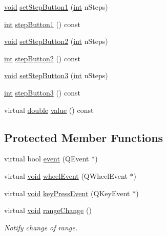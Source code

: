 \begin{DoxyCompactItemize}
\item 
\hyperlink{group___u_a_v_objects_plugin_ga444cf2ff3f0ecbe028adce838d373f5c}{void} \hyperlink{class_qwt_counter_ae56a556a72955b6d10419f2c41779383}{set\-Step\-Button1} (\hyperlink{ioapi_8h_a787fa3cf048117ba7123753c1e74fcd6}{int} n\-Steps)
\item 
\hyperlink{ioapi_8h_a787fa3cf048117ba7123753c1e74fcd6}{int} \hyperlink{class_qwt_counter_a8e0b28f111c45b3a2241fd8889bc8bce}{step\-Button1} () const 
\item 
\hyperlink{group___u_a_v_objects_plugin_ga444cf2ff3f0ecbe028adce838d373f5c}{void} \hyperlink{class_qwt_counter_a0d764a96706593d8c8b51338e92abfcc}{set\-Step\-Button2} (\hyperlink{ioapi_8h_a787fa3cf048117ba7123753c1e74fcd6}{int} n\-Steps)
\item 
\hyperlink{ioapi_8h_a787fa3cf048117ba7123753c1e74fcd6}{int} \hyperlink{class_qwt_counter_a7d99de95e1c05e4994413e6d8cd641fe}{step\-Button2} () const 
\item 
\hyperlink{group___u_a_v_objects_plugin_ga444cf2ff3f0ecbe028adce838d373f5c}{void} \hyperlink{class_qwt_counter_a8b55539578de083793b8310cb8909294}{set\-Step\-Button3} (\hyperlink{ioapi_8h_a787fa3cf048117ba7123753c1e74fcd6}{int} n\-Steps)
\item 
\hyperlink{ioapi_8h_a787fa3cf048117ba7123753c1e74fcd6}{int} \hyperlink{class_qwt_counter_abc6eb2073cc7d7b5f1d7e4c6c7b205c9}{step\-Button3} () const 
\item 
virtual \hyperlink{_super_l_u_support_8h_a8956b2b9f49bf918deed98379d159ca7}{double} \hyperlink{class_qwt_counter_aa40eebb77b2401d0a3fc4558befaebb8}{value} () const 
\end{DoxyCompactItemize}
\subsection*{Protected Member Functions}
\begin{DoxyCompactItemize}
\item 
virtual bool \hyperlink{class_qwt_counter_ad855f1cec9068fd73cce5e2e29fb5771}{event} (Q\-Event $\ast$)
\item 
virtual \hyperlink{group___u_a_v_objects_plugin_ga444cf2ff3f0ecbe028adce838d373f5c}{void} \hyperlink{class_qwt_counter_acdada1ba1d5873b9c8b3f75d63b4685a}{wheel\-Event} (Q\-Wheel\-Event $\ast$)
\item 
virtual \hyperlink{group___u_a_v_objects_plugin_ga444cf2ff3f0ecbe028adce838d373f5c}{void} \hyperlink{class_qwt_counter_aafdc19bff96fcafc4b8ed8e3bf7bf07b}{key\-Press\-Event} (Q\-Key\-Event $\ast$)
\item 
virtual \hyperlink{group___u_a_v_objects_plugin_ga444cf2ff3f0ecbe028adce838d373f5c}{void} \hyperlink{class_qwt_counter_a4fd4e750b1f5a852250e57778a3e4159}{range\-Change} ()
\begin{DoxyCompactList}\small\item\em Notify change of range. \end{DoxyCompactList}\end{DoxyCompactItemize}
